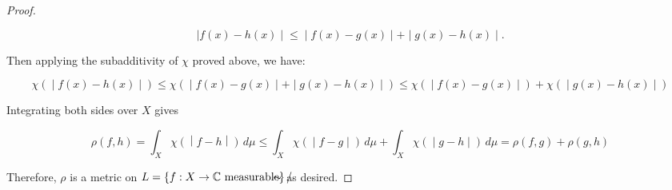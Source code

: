 \begin{proof}
\begin{itemize}
  \[\left. |f(x) - h(x) \middle| \leq \middle| f(x) - g(x) \middle| + \middle| g(x) - h(x) \middle| . \right.\]

  Then applying the subadditivity of \(\chi\) proved above, we have:

  \[\left. \chi( \middle| f(x) - h(x) \middle| ) \leq \chi( \middle| f(x) - g(x) \middle| + \middle| g(x) - h(x) \middle| ) \leq \chi( \middle| f(x) - g(x) \middle| ) + \chi( \middle| g(x) - h(x) \middle| ) \right.\]

  Integrating both sides over \(X\) gives

  \[\left. \rho(f,h) = \int_{X}\chi( \middle| f - h \middle| )\, d\mu \leq \int_{X}\chi( \middle| f - g \middle| )\, d\mu + \int_{X}\chi( \middle| g - h \middle| )\, d\mu = \rho(f,g) + \rho(g,h) \right.\]
\end{itemize}

Therefore, \(\rho\) is a metric on \(L = \left\{ {f:X\rightarrow\mathbb{C}\ \text{measurable}} \right\}/\mspace{-18mu}\mspace{-18mu} \sim\) as desired.

\end{proof}

